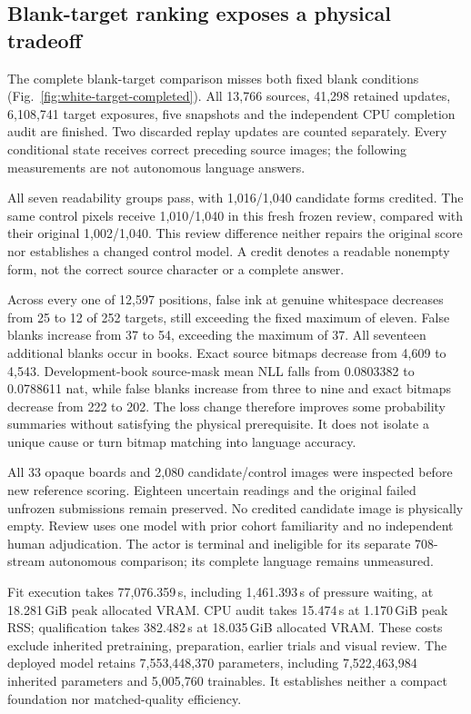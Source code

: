 \documentclass[12pt,a4paper]{article}
\providecommand{\DIFadd}[1]{{\protect\color{blue} \sf #1}} %
\begin{document}
\subsection*{\DIFadd{Blank-target ranking exposes a physical tradeoff}}

\DIFadd{The complete blank-target comparison misses both fixed blank conditions
(Fig.~\ref{fig:white-target-completed}). All 13,766 sources, 41,298 retained
updates, 6,108,741 target exposures, five snapshots and the independent CPU
completion audit are finished. Two discarded replay updates are counted
separately. Every conditional state receives correct preceding source images;
the following measurements are not autonomous language answers.
}

\DIFadd{All seven readability groups pass, with 1,016/1,040 candidate forms credited.
The same control pixels receive 1,010/1,040 in this fresh frozen review, compared
with their original 1,002/1,040. This review difference neither repairs the
original score nor establishes a changed control model. A credit denotes a
readable nonempty form, not the correct source character or a complete answer.
}

\DIFadd{Across every one of 12,597 positions, false ink at genuine whitespace decreases
from 25 to 12 of 252 targets, still exceeding the fixed maximum of eleven.
False blanks increase from 37 to 54, exceeding the maximum of 37. All seventeen
additional blanks occur in books. Exact source bitmaps decrease from 4,609 to
4,543. Development-book source-mask mean NLL falls from 0.0803382 to 0.0788611
nat, while false blanks increase from three to nine and exact bitmaps decrease
from 222 to 202. The loss change therefore improves some probability summaries
without satisfying the physical prerequisite. It does not isolate a unique
cause or turn bitmap matching into language accuracy.
}

\DIFadd{All 33 opaque boards and 2,080 candidate/control images were inspected before
new reference scoring. Eighteen uncertain readings and the original failed
unfrozen submissions remain preserved. No credited candidate image is physically
empty. Review uses one model with prior cohort familiarity and no independent
human adjudication. The actor is terminal and ineligible for its separate
708-stream autonomous comparison; its complete language remains unmeasured.
}

\DIFadd{Fit execution takes 77,076.359\,s, including 1,461.393\,s of pressure waiting,
at 18.281\,GiB peak allocated VRAM. CPU audit takes 15.474\,s at 1.170\,GiB peak
RSS; qualification takes 382.482\,s at 18.035\,GiB allocated VRAM. These costs
exclude inherited pretraining, preparation, earlier trials and visual review.
The deployed model retains 7,553,448,370 parameters, including 7,522,463,984
inherited parameters and 5,005,760 trainables. It establishes neither a compact
foundation nor matched-quality efficiency.
}
\end{document}
